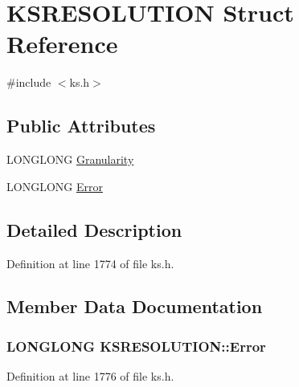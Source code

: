 \hypertarget{struct_k_s_r_e_s_o_l_u_t_i_o_n}{}\section{K\+S\+R\+E\+S\+O\+L\+U\+T\+I\+ON Struct Reference}
\label{struct_k_s_r_e_s_o_l_u_t_i_o_n}


{\ttfamily \#include $<$ks.\+h$>$}

\subsection*{Public Attributes}
\begin{DoxyCompactItemize}
\item 
L\+O\+N\+G\+L\+O\+NG \hyperlink{struct_k_s_r_e_s_o_l_u_t_i_o_n_a92a6f90dedb6ec2f4884d442c06e0721}{Granularity}
\item 
L\+O\+N\+G\+L\+O\+NG \hyperlink{struct_k_s_r_e_s_o_l_u_t_i_o_n_ab085806756d6e5fef551866d83b20402}{Error}
\end{DoxyCompactItemize}


\subsection{Detailed Description}


Definition at line 1774 of file ks.\+h.



\subsection{Member Data Documentation}
\subsubsection[{\texorpdfstring{Error}{Error}}]{\setlength{\rightskip}{0pt plus 5cm}L\+O\+N\+G\+L\+O\+NG K\+S\+R\+E\+S\+O\+L\+U\+T\+I\+O\+N\+::\+Error}\hypertarget{struct_k_s_r_e_s_o_l_u_t_i_o_n_ab085806756d6e5fef551866d83b20402}{}\label{struct_k_s_r_e_s_o_l_u_t_i_o_n_ab085806756d6e5fef551866d83b20402}


Definition at line 1776 of file ks.\+h.

